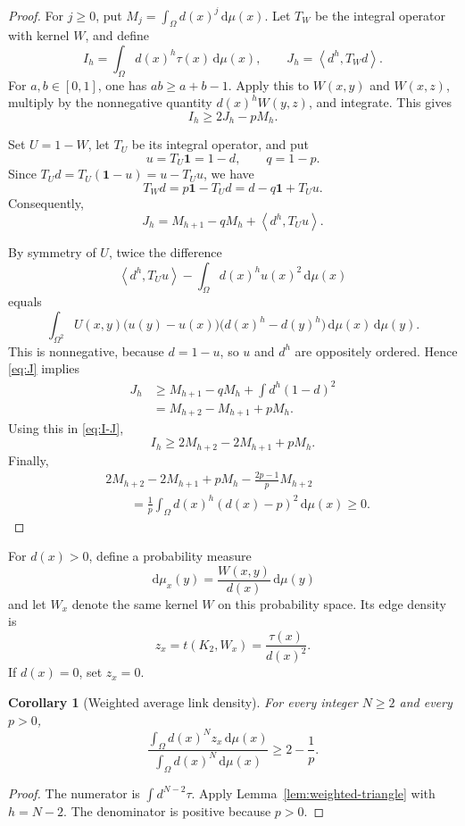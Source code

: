 \documentclass[11pt]{article}
\newtheorem{corollary}[theorem]{Corollary}
\newcommand{\dd}{\,\mathrm{d}}
\newcommand{\one}{\mathbf{1}}
\newcommand{\ip}[2]{\left\langle #1,#2\right\rangle}
\begin{document}
\begin{proof}
For $j\geq0$, put $M_j=\int_\Omega d(x)^j\dd\mu(x)$.  Let $T_W$
be the integral operator with kernel $W$, and define
\[
I_h=\int_\Omega d(x)^h\tau(x)\dd\mu(x),
\qquad
J_h=\ip{d^h}{T_Wd}.
\]
For $a,b\in[0,1]$, one has $ab\geq a+b-1$.  Apply this to
$W(x,y)$ and $W(x,z)$, multiply by the nonnegative quantity
$d(x)^hW(y,z)$, and integrate.  This gives
\begin{equation}
I_h\geq2J_h-pM_h.
\label{eq:I-J}
\end{equation}

Set $U=1-W$, let $T_U$ be its integral operator, and put
\[
u=T_U\one=1-d,
\qquad q=1-p.
\]
Since $T_Ud=T_U(\one-u)=u-T_Uu$, we have
\[
T_Wd=p\one-T_Ud=d-q\one+T_Uu.
\]
Consequently,
\begin{equation}
J_h=M_{h+1}-qM_h+\ip{d^h}{T_Uu}.
\label{eq:J}
\end{equation}

By symmetry of $U$, twice the difference
\[
\ip{d^h}{T_Uu}-\int_\Omega d(x)^hu(x)^2\dd\mu(x)
\]
equals
\[
\int_{\Omega^2}U(x,y)
\bigl(u(y)-u(x)\bigr)
\bigl(d(x)^h-d(y)^h\bigr)
\dd\mu(x)\dd\mu(y).
\]
This is nonnegative, because $d=1-u$, so $u$ and $d^h$ are oppositely
ordered.  Hence \eqref{eq:J} implies
\begin{align*}
J_h
&\geq
M_{h+1}-qM_h+\int d^h(1-d)^2
\\
&=M_{h+2}-M_{h+1}+pM_h.
\end{align*}
Using this in \eqref{eq:I-J},
\[
I_h\geq2M_{h+2}-2M_{h+1}+pM_h.
\]
Finally,
\begin{align*}
&2M_{h+2}-2M_{h+1}+pM_h
-\frac{2p-1}{p}M_{h+2}
\\
&\qquad=
\frac1p\int_\Omega d(x)^h(d(x)-p)^2\dd\mu(x)
\geq0.
\end{align*}
\end{proof}

For $d(x)>0$, define a probability measure
\[
\dd\mu_x(y)=\frac{W(x,y)}{d(x)}\dd\mu(y)
\]
and let $W_x$ denote the same kernel $W$ on this probability space.
Its edge density is
\[
z_x=t(K_2,W_x)=\frac{\tau(x)}{d(x)^2}.
\]
If $d(x)=0$, set $z_x=0$.

\begin{corollary}[Weighted average link density]
\label{cor:link-average}
For every integer $N\geq2$ and every $p>0$,
\[
\frac{\int_\Omega d(x)^Nz_x\dd\mu(x)}
{\int_\Omega d(x)^N\dd\mu(x)}
\geq2-\frac1p.
\]
\end{corollary}

\begin{proof}
The numerator is $\int d^{N-2}\tau$.  Apply
Lemma~\ref{lem:weighted-triangle} with $h=N-2$.  The denominator is
positive because $p>0$.
\end{proof}
\end{document}

